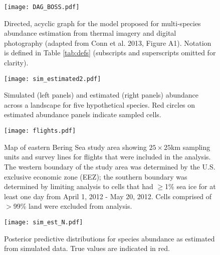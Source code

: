 \documentclass[12pt,fleqn]{article}
\begin{document}
\begin{flushleft}
\begin{figure}
\begin{center}
\texttt{[image: DAG\_BOSS.pdf]}
\end{center}
\caption{Directed, acyclic graph for the model proposed for multi-species abundance estimation from thermal imagery and digital photography (adapted from Conn et al. 2013, Figure A1).  Notation is defined in Table \ref{tab:defs} (subscripts and superscripts omitted for clarity).}
\label{fig:DAG}
\end{figure}

\begin{figure}
\begin{center}
\texttt{[image: sim\_estimated2.pdf]}
\end{center}
\caption{Simulated (left panels) and estimated (right panels) abundance across a landscape for five hypothetical species.  Red
circles on estimated abundance panels indicate sampled cells.}
\label{fig:sim_est}
\end{figure}

\begin{figure}
\begin{center}
\texttt{[image: flights.pdf]}
\end{center}
\caption{Map of eastern Bering Sea study area showing $25 \times 25$km sampling units and
   survey lines for flights that were included in the analysis.  The western boundary of the study area was determined by the U.S. exclusive economic zone (EEZ); the southern boundary was determined by limiting analysis to cells that had $\ge$1\% sea ice for at least one day from April 1, 2012 - May 20, 2012.  Cells comprised of $>$99\% land were excluded from analysis.}
\label{fig:flights}
\end{figure}

\begin{figure}
\begin{center}
\texttt{[image: sim\_est\_N.pdf]}
\end{center}
\caption{Posterior predictive distributions for species abundance as estimated from simulated data.  True values are indicated
in red.}
\label{fig:sim_N}
\end{figure}


\end{flushleft}
\end{document}
